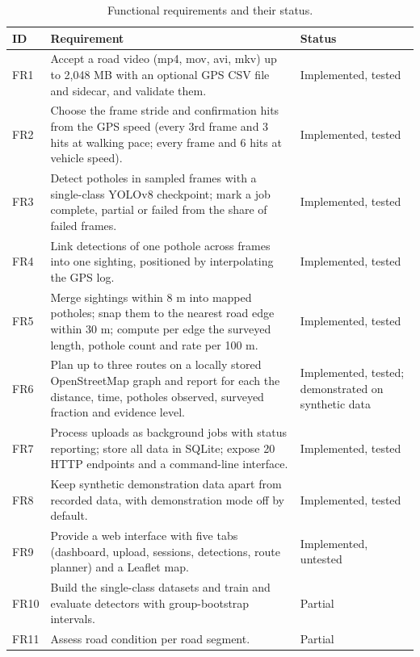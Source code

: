 \begin{table}[!htbp]
\centering
\small
\renewcommand{\arraystretch}{1.2}
\begin{tabular}{|L{0.9cm}|L{9.4cm}|L{2.6cm}|}
\hline
\textbf{ID} & \textbf{Requirement} & \textbf{Status} \\
\hline
FR1 & Accept a road video (mp4, mov, avi, mkv) up to 2,048 MB with an optional GPS CSV file and sidecar, and validate them. & Implemented, tested \\
\hline
FR2 & Choose the frame stride and confirmation hits from the GPS speed (every 3rd frame and 3 hits at walking pace; every frame and 6 hits at vehicle speed). & Implemented, tested \\
\hline
FR3 & Detect potholes in sampled frames with a single-class YOLOv8 checkpoint; mark a job complete, partial or failed from the share of failed frames. & Implemented, tested \\
\hline
FR4 & Link detections of one pothole across frames into one sighting, positioned by interpolating the GPS log. & Implemented, tested \\
\hline
FR5 & Merge sightings within 8 m into mapped potholes; snap them to the nearest road edge within 30 m; compute per edge the surveyed length, pothole count and rate per 100 m. & Implemented, tested \\
\hline
FR6 & Plan up to three routes on a locally stored OpenStreetMap graph and report for each the distance, time, potholes observed, surveyed fraction and evidence level. & Implemented, tested; demonstrated on synthetic data \\
\hline
FR7 & Process uploads as background jobs with status reporting; store all data in SQLite; expose 20 HTTP endpoints and a command-line interface. & Implemented, tested \\
\hline
FR8 & Keep synthetic demonstration data apart from recorded data, with demonstration mode off by default. & Implemented, tested \\
\hline
FR9 & Provide a web interface with five tabs (dashboard, upload, sessions, detections, route planner) and a Leaflet map. & Implemented, untested \\
\hline
FR10 & Build the single-class datasets and train and evaluate detectors with group-bootstrap intervals. & Partial \\
\hline
FR11 & Assess road condition per road segment. & Partial \\
\hline
\end{tabular}
\caption{Functional requirements and their status.}
\label{tab:ch3-fr}
\end{table}

